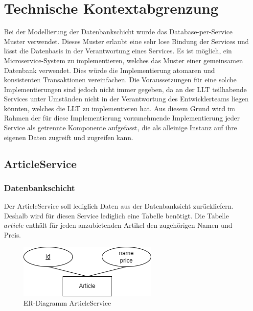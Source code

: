 \section{Technische Kontextabgrenzung}
Bei der Modellierung der Datenbankschicht wurde das Database-per-Service Muster verwendet. Dieses Muster erlaubt eine sehr lose Bindung der Services und lässt die Datenbasis in der Verantwortung eines Services. Es ist möglich, ein Microservice-System zu implementieren, welches das Muster einer gemeinsamen Datenbank verwendet. Dies würde die Implementierung atomaren und konsistenten Transaktionen vereinfachen. Die Voraussetzungen für eine solche Implementierungen sind jedoch nicht immer gegeben, da an der LLT teilhabende Services unter Umständen nicht in der Verantwortung des Entwicklerteams liegen könnten, welches die LLT zu implementieren hat. Aus diesem Grund wird im Rahmen der für diese Implementierung vorzunehmende Implementierung jeder Service als getrennte Komponente aufgefasst, die als alleinige Instanz auf ihre eigenen Daten zugreift und zugreifen kann.


\subsection{ArticleService}
\subsubsection{Datenbankschicht}

Der ArticleService soll lediglich Daten aus der Datenbanksicht zurückliefern. Deshalb wird für diesen Service lediglich eine Tabelle benötigt. Die Tabelle $article$ enthält für jeden anzubietenden Artikel den zugehörigen Namen und Preis.

\begin{figure}[h!]
	\centering
	\includegraphics[scale=0.5]{figures/DatabaseER/ArticleServiceTables.png}
	\caption{ER-Diagramm ArticleService}
\end{figure}
\FloatBarrier

